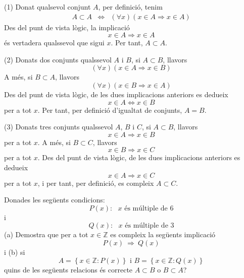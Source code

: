 \begin{solucio}
(1) Donat qualsevol conjunt $A$, per definició, tenim%
\begin{equation*}
\begin{array}{ccc}
A\subset A & \Longleftrightarrow & \left( \forall x\right) \left( x\in
A\Longrightarrow x\in A\right)%
\end{array}%
\end{equation*}%
Des del punt de vista lògic, la implicació%
\begin{equation*}
x\in A\Longrightarrow x\in A
\end{equation*}%
és vertadera qualssevol que sigui $x$. Per tant, $A\subset A$.

(2) Donats dos conjunts qualssevol $A$ i $B$, si $A\subset B$, llavors%
\begin{equation*}
\left( \forall x\right) \left( x\in A\Longrightarrow x\in B\right)
\end{equation*}%
A més, si $B\subset A$, llavors%
\begin{equation*}
\left( \forall x\right) \left( x\in B\Longrightarrow x\in A\right)
\end{equation*}%
Des del punt de vista lògic, de les dues implicacions anteriors es
dedueix%
\begin{equation*}
x\in A\Longleftrightarrow x\in B
\end{equation*}%
per a tot $x$. Per tant, per definició d'igualtat de conjunts, $A=B$.

(3) Donats tres conjunts qualssevol $A$, $B$ i $C$, si $A\subset B$, llavors%
\begin{equation*}
x\in A\Longrightarrow x\in B
\end{equation*}%
per a tot $x$. A més, si $B\subset C$, llavors%
\begin{equation*}
x\in B\Longrightarrow x\in C
\end{equation*}%
per a tot $x$. Des del punt de vista lògic, de les dues implicacions
anteriors es dedueix%
\begin{equation*}
x\in A\Longrightarrow x\in C
\end{equation*}%
per a tot $x$, i per tant, per definició, es compleix $A\subset C$.
\end{solucio}

\begin{exercici}
Donades les següents condicions:%
\begin{equation*}
P(x):\text{ }x\text{ és múltiple de }6
\end{equation*}%
i%
\begin{equation*}
Q(x):\text{ }x\text{ és múltiple de }3
\end{equation*}%
(a) Demostra que per a tot $x\in \mathbb{Z}$ es compleix la següents
implicació
\begin{equation*}
P(x)~\Longrightarrow ~Q(x)
\end{equation*}%
i (b) si%
\begin{equation*}
A=\left\{ x\in \mathbb{Z}:P(x)\right\} \text{ \ \ i \ \ }B=\left\{ x\in
\mathbb{Z}:Q(x)\right\}
\end{equation*}%
quins de les següents relacions és correcte $A\subset B$ o $B\subset
A$?
\end{exercici}

